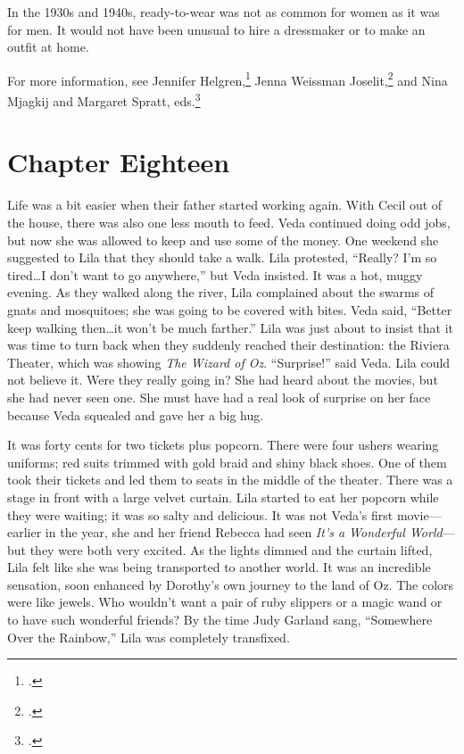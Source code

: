 \documentclass[
  american,
  letterpaper,
]{book}
\begin{document}
In the 1930s and 1940s, ready-to-wear was not as common for women as it
was for men. It would not have been unusual to hire a dressmaker or to
make an outfit at home.

For more information, see Jennifer Helgren,\footnote{.} Jenna Weissman
Joselit,\footnote{.} and Nina Mjagkij and Margaret Spratt,
eds.\footnote{.}


\chapter{Chapter Eighteen}\label{chapter-eighteen}

Life was a bit easier when their father started working again. With
Cecil out of the house, there was also one less mouth to feed. Veda
continued doing odd jobs, but now she was allowed to keep and use some
of the money. One weekend she suggested to Lila that they should take a
walk. Lila protested, ``Really? I'm so tired\ldots I don't want to go
anywhere,'' but Veda insisted. It was a hot, muggy evening. As they
walked along the river, Lila complained about the swarms of gnats and
mosquitoes; she was going to be covered with bites. Veda said, ``Better
keep walking then\ldots it won't be much farther.'' Lila was just about
to insist that it was time to turn back when they suddenly reached their
destination: the Riviera Theater, which was showing \emph{The Wizard of
Oz}. ``Surprise!'' said Veda. Lila could not believe it. Were they
really going in? She had heard about the movies, but she had never seen
one. She must have had a real look of surprise on her face because Veda
squealed and gave her a big hug.

It was forty cents for two tickets plus popcorn. There were four ushers
wearing uniforms; red suits trimmed with gold braid and shiny black
shoes. One of them took their tickets and led them to seats in the
middle of the theater. There was a stage in front with a large velvet
curtain. Lila started to eat her popcorn while they were waiting; it was
so salty and delicious. It was not Veda's first movie---earlier in the
year, she and her friend Rebecca had seen \emph{It's a Wonderful
World}---but they were both very excited. As the lights dimmed and the
curtain lifted, Lila felt like she was being transported to another
world. It was an incredible sensation, soon enhanced by Dorothy's own
journey to the land of Oz. The colors were like jewels. Who wouldn't
want a pair of ruby slippers or a magic wand or to have such wonderful
friends? By the time Judy Garland sang, ``Somewhere Over the Rainbow,''
Lila was completely transfixed.
\end{document}
